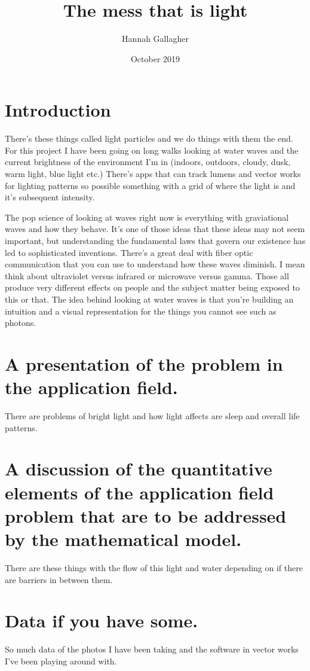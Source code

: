 \documentclass{article}
\title{The mess that is light}
\author{Hannah Gallagher}
\date{October 2019}
\begin{document}
\maketitle

\section{Introduction}
There's these things called light particles and we do things with them the end. For this project I have been going on long walks looking at water waves and the current brightness of the environment I'm in (indoors, outdoors, cloudy, dusk, warm light, blue light etc.) There's apps that can track lumens and vector works for lighting patterns so possible something with a grid of where the light is and it's subsequent intensity. 

\par 
The pop science of looking at waves right now is everything with graviational waves and how they behave. It's one of those ideas that these ideas may not seem important, but understanding the fundamental laws that govern our existence has led to sophisticated inventions. There's a great deal with fiber optic communication that you can use to understand how these waves diminish. I mean think about ultraviolet versus infrared or microwave versus gamma. Those all produce very different effects on people and the subject matter being exposed to this or that. The idea behind looking at water waves is that you're building an intuition and a visual representation for the things you cannot see such as photons. 

\section{A presentation of the problem in the application field.}

There are problems of bright light and how light affects are sleep and overall life patterns. 

\section{A discussion of the quantitative elements of the application field problem that are to be addressed by the mathematical model.}
There are these things with the flow of this light and water depending on if there are barriers in between them. 

\section{Data if you have some.} 
So much data of the photos I have been taking and the software in vector works I've been playing around with. 
\end{document}
